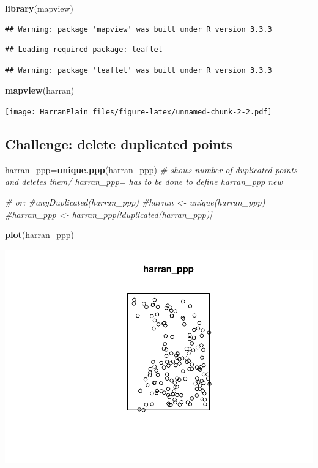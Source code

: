 \documentclass[]{article}
\newenvironment{Shaded}{\begin{snugshade}}{\end{snugshade}}
\newcommand{\KeywordTok}[1]{\textcolor[rgb]{0.13,0.29,0.53}{\textbf{{#1}}}}
\newcommand{\CommentTok}[1]{\textcolor[rgb]{0.56,0.35,0.01}{\textit{{#1}}}}
\newcommand{\NormalTok}[1]{{#1}}
\begin{document}
\begin{Shaded}
\begin{Highlighting}[]
\KeywordTok{library}\NormalTok{(mapview)}
\end{Highlighting}
\end{Shaded}

\begin{verbatim}
## Warning: package 'mapview' was built under R version 3.3.3
\end{verbatim}

\begin{verbatim}
## Loading required package: leaflet
\end{verbatim}

\begin{verbatim}
## Warning: package 'leaflet' was built under R version 3.3.3
\end{verbatim}

\begin{Shaded}
\begin{Highlighting}[]
\KeywordTok{mapview}\NormalTok{(harran)}
\end{Highlighting}
\end{Shaded}

\texttt{[image: HarranPlain\_files/figure-latex/unnamed-chunk-2-2.pdf]}

\subsection{Challenge: delete duplicated
points}\label{challenge-delete-duplicated-points}

\begin{Shaded}
\begin{Highlighting}[]
\NormalTok{harran_ppp=}\KeywordTok{unique.ppp}\NormalTok{(harran_ppp) }\CommentTok{# shows number of duplicated points and deletes them/ harran_ppp= has to be done to define harran_ppp new}


\CommentTok{# or:}
\CommentTok{#anyDuplicated(harran_ppp)}
\CommentTok{#harran <- unique(harran_ppp)}
\CommentTok{#harran_ppp <- harran_ppp[!duplicated(harran_ppp)]}

\KeywordTok{plot}\NormalTok{(harran_ppp)}
\end{Highlighting}
\end{Shaded}

\includegraphics{HarranPlain_files/figure-latex/unnamed-chunk-3-1.pdf}
\end{document}
